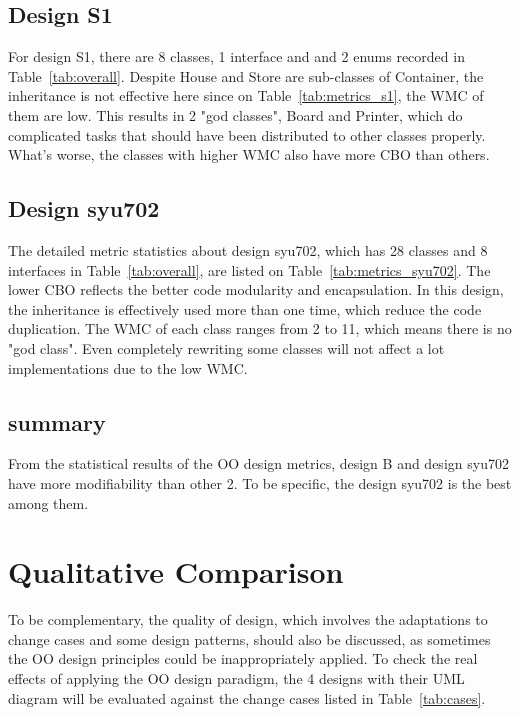 \documentclass[conference]{IEEEtran}
\begin{document}
	\subsection{Design S1}
	
	For design S1, there are 8 classes, 1 interface and and 2 enums recorded in Table~\ref{tab:overall}. Despite House and Store are sub-classes of Container, the inheritance is not effective here since on Table~\ref{tab:metrics_s1}, the \gls{WMC} of them are low. This results in 2 "god classes", Board and Printer, which do complicated tasks that should have been distributed to other classes properly. What's worse, the classes with higher \gls{WMC} also have more \gls{CBO} than others.
	
	\subsection{Design syu702}
	
	The detailed metric statistics about design syu702, which has 28 classes and 8 interfaces in Table~\ref{tab:overall}, are listed on Table~\ref{tab:metrics_syu702}. The lower \gls{CBO} reflects the better code modularity and encapsulation.  In this design, the inheritance is effectively used more than one time, which reduce the code duplication. The \gls{WMC} of each class ranges from 2 to 11, which means there is no "god class". Even completely rewriting some classes will not affect a lot implementations due to the low \gls{WMC}.
	
	\subsection{summary}
	From the statistical results of the \gls{OO} design metrics, design B and design syu702 have more modifiability than other 2. To be specific, the design syu702 is the best among them.  
	 
	\section{Qualitative Comparison}
	To be complementary, the quality of design, which involves the adaptations to change cases and some design patterns, should also be discussed, as sometimes the \gls{OO} design principles could be inappropriately applied. To check the real effects of applying the \gls{OO} design paradigm, the 4 designs with their UML diagram will be evaluated against the change cases listed in Table~\ref{tab:cases}.
	
	
\end{document}

